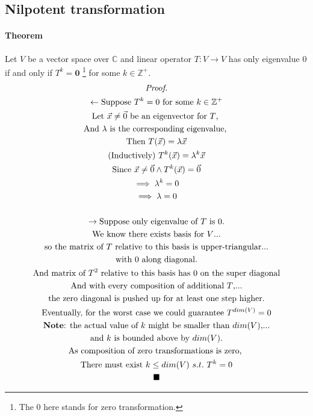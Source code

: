 \documentclass[11pt]{article}
\newcommand{\trans}[3]{{#1}: {#2} \to {#3}}
\newcommand{\theorem}[0]{\paragraph{Theorem}}
\newcommand{\C}[0]{\mathbb{C}}
\newcommand{\tx}[1]{\text{{#1}}}
\begin{document}
	\subsection{Nilpotent transformation}
	\theorem Let $V$ be a vector space over $\C$ and linear operator $\trans{T}{V}{V}$ has only eigenvalue 0 if and only if $T^k = \textbf{0}$ \footnote{The $0$ here stands for zero transformation.} for some $k \in \mathbb{Z}^+$.
	\begin{multline*}
		\emph{Proof.} \\
		\leftarrow \text{Suppose } T^k = 0 \text{ for some } k \in \mathbb{Z}^+ \\
		\tx{Let } \vec{x} \neq \vec{0} \tx{ be an eigenvector for $T$, }\\
		\tx{And } \lambda \tx{ is the corresponding eigenvalue, }\\
		\tx{Then } T(\vec{x}) = \lambda \vec{x} \\
		\tx{(Inductively) } T^k(\vec{x}) = \lambda^k \vec{x}\\
		\tx{Since } \vec{x} \neq \vec{0} \land T^k(\vec{x}) = \vec{0} \\
		\implies \lambda^k = 0 \\
		\implies \lambda = 0 \\
		\\
		\rightarrow \tx{Suppose only eigenvalue of $T$ is $0$.}\\
		\tx{We know there exists basis for $V$...}\\
		\tx{so the matrix of $T$ relative to this basis is upper-triangular...} \\
		\tx{with $0$ along diagonal.} \\
		\tx{And matrix of $T^2$ relative to this basis has $0$ on the super diagonal} \\
		\tx{And with every composition of additional $T$,...}\\
		\tx{the zero diagonal is pushed up for at least one step higher.} \\
		\tx{Eventually, for the worst case we could guarantee }T^{dim(V)} = 0 \\
		\tx{\textbf{Note}: the actual value of $k$ might be smaller than $dim(V)$,...} \\
		\tx{and $k$ is bounded above by $dim(V)$.} \\
		\tx{As composition of zero transformations is zero, } \\
		\tx{There must exist } k \leq dim(V)\ s.t.\ T^k = 0 \\
		\blacksquare
	\end{multline*}
	
\end{document}
